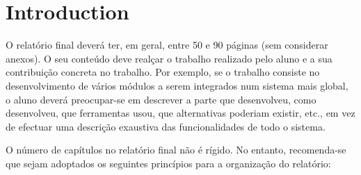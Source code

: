 \chapter{Introduction}

O relatório final deverá ter, em geral, entre 50 e 90 páginas (sem considerar anexos). O seu conteúdo deve realçar o trabalho realizado pelo aluno e a sua contribuição concreta no trabalho. Por exemplo, se o trabalho consiste no desenvolvimento de vários módulos a serem integrados num sistema mais global, o aluno deverá preocupar-se em descrever a parte que desenvolveu, como desenvolveu, que ferramentas usou, que alternativas poderiam existir, etc., em vez de efectuar uma descrição exaustiva das funcionalidades de todo o sistema.

O número de capítulos no relatório final não é rígido. No entanto, recomenda-se que sejam adoptados os seguintes princípios para a organização do relatório:

